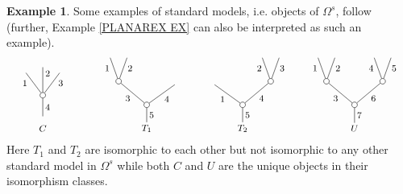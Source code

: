 \documentclass[a4paper,10pt
,draft
]{article}%
\numberwithin{equation}{section}
\numberwithin{figure}{section}
\theoremstyle{definition} %
\newtheorem{example}[equation]{Example}%
\newcommand{\1}{\ensuremath{\mathbbm 1}}%
\begin{document}
\begin{example}\label{STANDMODEL EX}
	Some examples of standard models, i.e. objects of $\Omega^s$, follow (further, Example \ref{PLANAREX EX} can also be interpreted as such an example).
\[
	\begin{tikzpicture}[grow=up,auto,level distance=2.1em,
	every node/.style = {font=\footnotesize,inner sep=2pt},
	dummy/.style={circle,draw,inner sep=0pt,minimum size=1.75mm}]
		\node at (-0.25,0) {$C$};
		\node at (-0.25,0.3) {}
			child{node [dummy] {}
				child[sibling distance = 1.5em,level distance= 2em]{
				edge from parent node [swap, near end] {$3$}}
				child[sibling distance = 1.5em,level distance= 2.5em]{
				edge from parent node [swap, near end] {$2$}}
				child[sibling distance = 1.5em,level distance= 2em]{
				edge from parent node [near end] {$1$}}
			edge from parent node [swap] {$4$}};
		\node at (3,0) {$T_1$}
			child{node [dummy] {}
				child[sibling distance = 5em, level distance=1.8em]{
				edge from parent node [swap] {$4$}}
				child[sibling distance = 5em]{node [dummy] {}
					child[sibling distance = 1.5em]{
					edge from parent node [swap,near end] {$2$}}
					child[sibling distance = 1.5em]{
					edge from parent node [near end] {$1$}}
				edge from parent node {$3$}}
			edge from parent node [swap] {$5$}};
		\node at (6,0) {$T_2$}
			child{node [dummy] {}
				child[sibling distance = 5em]{node [dummy] {}
					child[sibling distance = 1.5em]{
					edge from parent node [swap,near end] {$3$}}
					child[sibling distance = 1.5em]{
					edge from parent node [near end] {$2$}}
				edge from parent node [swap] {$4$}}
				child[sibling distance = 5em, level distance=1.8em]{
				edge from parent node {$1$}}
			edge from parent node [swap] {$5$}};
		\node at  (9.5,0) {$U$}
			child{node [dummy] {}
				child[sibling distance = 5em]{node [dummy] {}
					child[sibling distance = 1.5em]{
					edge from parent node [swap,near end] {$5$}}
					child[sibling distance = 1.5em]{
					edge from parent node [near end] {$4$}}
				edge from parent node [swap] {$6$}}
				child[sibling distance = 5em]{node [dummy] {}
					child[sibling distance = 1.5em]{
					edge from parent node [swap,near end] {$2$}}
					child[sibling distance = 1.5em]{
					edge from parent node [near end] {$1$}}
				edge from parent node {$3$}}
			edge from parent node [swap] {$7$}};
	\end{tikzpicture}
\]
Here $T_1$ and $T_2$ are isomorphic to each other but not isomorphic to any other standard model in $\Omega^s$ while both $C$ and $U$ are the unique objects in their isomorphism classes. 
\end{example}
\end{document}
